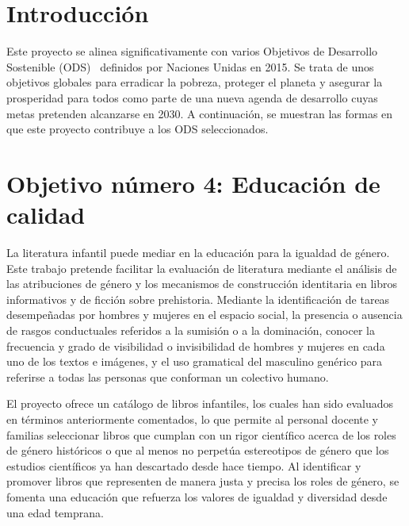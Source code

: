
\section{Introducción}
Este proyecto se alinea significativamente con varios Objetivos de Desarrollo Sostenible (ODS)~\cite{ODS} definidos por Naciones Unidas en 2015. Se trata de unos objetivos globales para erradicar la pobreza, proteger el planeta y asegurar la prosperidad para todos como parte de una nueva agenda de desarrollo cuyas metas pretenden alcanzarse en 2030. A continuación, se muestran las formas en que este proyecto contribuye a los ODS seleccionados.

\section{Objetivo número 4: Educación de calidad}
La literatura infantil puede mediar en la educación para la igualdad de género.  Este trabajo pretende facilitar la evaluación de literatura mediante el análisis de las atribuciones de género y los mecanismos de construcción identitaria en libros informativos y de ficción sobre prehistoria. Mediante la identificación de tareas desempeñadas por hombres y mujeres en el espacio social, la presencia o ausencia de rasgos conductuales referidos a la sumisión o a la dominación, conocer la frecuencia y grado de visibilidad o invisibilidad de hombres y mujeres en cada uno de los textos e imágenes, y el uso gramatical del masculino genérico para referirse a todas las
personas que conforman un colectivo humano. 

El proyecto ofrece un catálogo de libros infantiles, los cuales han sido evaluados en términos anteriormente comentados, lo que permite al personal docente y familias seleccionar libros que cumplan con un rigor científico acerca de los roles de género históricos o que al menos no perpetúa estereotipos de género que los estudios científicos ya han descartado desde hace tiempo. Al identificar y promover libros que representen de manera justa y precisa los roles de género, se fomenta una educación que refuerza los valores de igualdad y diversidad desde una edad temprana.

